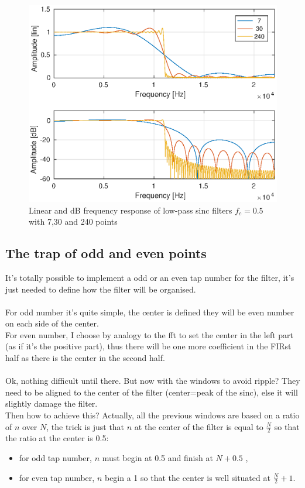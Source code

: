 \documentclass[twoside,twocolumn]{article}
\begin{document}
\begin{figure}[h!]
	\centering
	\includegraphics[scale=0.5]{./images/pt_influence.eps}
	\caption{Linear and dB frequency response of low-pass sinc filters $f_c=0.5$ with 7,30 and 240 points }
	\label{influence}
\end{figure} 

\subsection{The trap of odd and even points}
It's totally possible to implement a odd or an even tap number for the filter, it's just needed to define how the filter will be organised.\\ \\
For odd number it's quite simple, the center is defined they will be even number on each side of the center.\\
For even number,  I choose by analogy to the fft to set the center in the left part (as if it's the positive part), thus there will be one more coefficient in the FIRst half as there is the center in the second half.\\ \\

Ok, nothing difficult until there. But now with the windows to avoid ripple? They need to be aligned to the center of the filter (center=peak of the sinc), else it will slightly damage the filter.\\
Then how to achieve this? Actually, all the previous windows are based on a ratio of $n$ over $N$, the trick is just that $n$ at the center of the filter is equal to $\frac{N}{2}$ so that the ratio at the center is 0.5:
\begin{itemize}
	\item for odd tap number, $n$ must begin at 0.5 and finish at $N+0.5$ ,
	\item for even tap number, $n$ begin a 1 so that the center is well situated at $\frac{N}{2}+1$.
\end{itemize}
\end{document}
